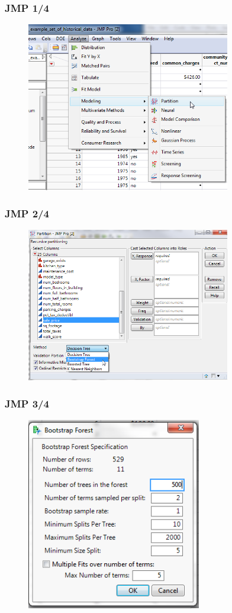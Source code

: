 \documentclass[handout]{beamer}
\begin{document}
\begin{frame}\frametitle{JMP 1/4}

\begin{figure}
\centering
\includegraphics[width=3.5in]{jmp01.png}
\end{figure}
\end{frame}


\begin{frame}\frametitle{JMP 2/4}

\begin{figure}
\centering
\includegraphics[width=3.5in]{jmp02.png}
\end{figure}
	
\end{frame}

\begin{frame}\frametitle{JMP 3/4}

\begin{figure}
\centering
\includegraphics[width=3.0in]{jmp03.png}
\end{figure}
	
\end{frame}
\end{document}
